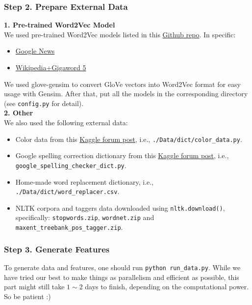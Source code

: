 \documentclass[12pt]{article}
\begin{document}
\begin{appendices}
\subsubsection{Step 2. Prepare External Data}
\textbf{1. Pre-trained Word2Vec Model}\\
We used pre-trained Word2Vec models listed in this \href{https://github.com/3Top/word2vec-api}{Github repo}. In specific:
\begin{itemize}
\item \href{https://drive.google.com/file/d/0B7XkCwpI5KDYNlNUTTlSS21pQmM/}{Google News}
\item \href{http://nlp.stanford.edu/data/glove.6B.zip}{Wikipedia+Gigaword 5}
\end{itemize}
We used glove-gensim\cite{glove-gensim} to convert GloVe vectors into Word2Vec format for easy usage with Gensim. After that, put all the models in the corresponding directory (see \texttt{config.py} for detail).\\
\textbf{2. Other}\\
We also used the following external data:
\begin{itemize}
\item Color data from this \href{https://www.kaggle.com/c/home-depot-product-search-relevance/forums/t/18967/data-preparation}{Kaggle forum post}, i.e., \texttt{./Data/dict/color\_data.py}.
\item Google spelling correction dictionary from this \href{https://www.kaggle.com/steubk/home-depot-product-search-relevance/fixing-typos}{Kaggle forum post}, i.e.,\\\texttt{google\_spelling\_checker\_dict.py}.
\item Home-made word replacement dictionary, i.e., \texttt{./Data/dict/word\_replacer.csv}.
\item NLTK corpora and taggers data downloaded using \texttt{nltk.download()}, specifically: \texttt{stopwords.zip}, \texttt{wordnet.zip} and \texttt{maxent\_treebank\_pos\_tagger.zip}.
\end{itemize}

\subsubsection{Step 3. Generate Features}
To generate data and features, one should run \texttt{python run\_data.py}. While we have tried our best to make things as parallelism and efficient as possible, this part might still take $1\sim 2$ days to finish, depending on the computational power. So be patient :)


\end{appendices}
\end{document}

